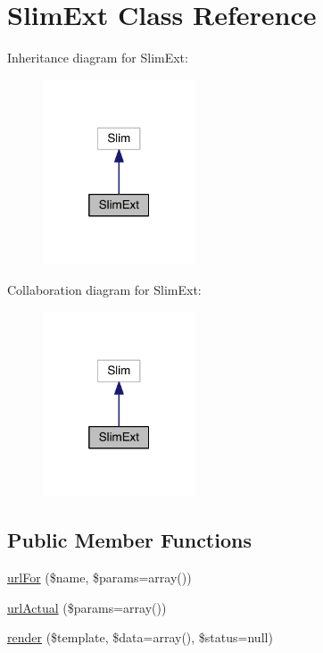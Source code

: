 \hypertarget{class_router_1_1_slim_ext}{\section{Slim\-Ext Class Reference}
\label{class_router_1_1_slim_ext}
}


Inheritance diagram for Slim\-Ext\-:
\nopagebreak
\begin{figure}[H]
\begin{center}
\leavevmode
\includegraphics[width=128pt]{class_router_1_1_slim_ext__inherit__graph}
\end{center}
\end{figure}


Collaboration diagram for Slim\-Ext\-:
\nopagebreak
\begin{figure}[H]
\begin{center}
\leavevmode
\includegraphics[width=128pt]{class_router_1_1_slim_ext__coll__graph}
\end{center}
\end{figure}
\subsection*{Public Member Functions}
\begin{DoxyCompactItemize}
\item 
\hyperlink{class_router_1_1_slim_ext_ac3e8140313d6ca2f974dca16673a9e7b}{url\-For} (\$name, \$params=array())
\item 
\hyperlink{class_router_1_1_slim_ext_a5cf6ca60d920790f99ee5ad30cbba23e}{url\-Actual} (\$params=array())
\item 
\hyperlink{class_router_1_1_slim_ext_aef8fe9d8caf6fcc5524e65e0842e4db5}{render} (\$template, \$data=array(), \$status=null)
\end{DoxyCompactItemize}
